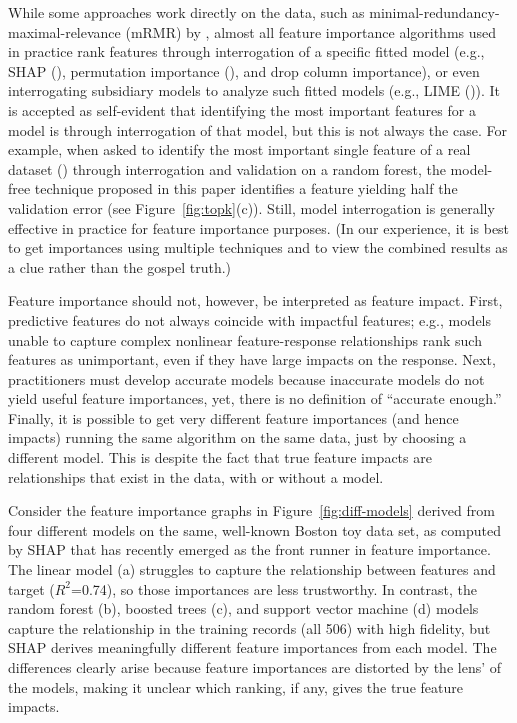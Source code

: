 \documentclass[twoside,11pt]{article}
\newcommand{\figref}[1]{Figure~\ref{#1}}
\begin{document}
While some approaches work directly on the data, such as minimal-redundancy-maximal-relevance (mRMR) by \cite{mRMR}, almost all feature importance algorithms used in practice rank features through interrogation of a specific fitted model (e.g., SHAP (\cite{shap}), permutation importance (\cite{RF}), and drop column importance), or even interrogating subsidiary models to analyze such fitted models (e.g., LIME (\cite{lime})). It is accepted as self-evident that identifying the most important features for a model is through interrogation of that  model, but this is not always the case.  For example, when asked to identify the most important single feature of a real dataset (\cite{bulldozer}) through interrogation and validation on a random forest, the model-free technique proposed in this paper identifies a feature yielding half the validation error (see \figref{fig:topk}(c)). Still, model interrogation is generally effective in practice for feature importance purposes. (In our experience, it is best to get importances using multiple techniques and to view the combined results as a clue rather than the gospel truth.)

Feature importance should not, however, be interpreted as feature impact. First, predictive features do not always coincide with impactful features; e.g., models unable to capture complex nonlinear feature-response relationships rank such features as unimportant, even if they have large impacts on the response. Next, practitioners must develop  accurate models because inaccurate models do not yield useful feature importances, yet, there is no definition of ``accurate enough.'' Finally, it is possible to get very different feature importances (and hence impacts) running the same algorithm on the same data, just by choosing a different model. This is despite the fact that true feature impacts are relationships that exist in the data, with or without a model.

Consider the feature importance graphs in \figref{fig:diff-models} derived from four different models on the same, well-known Boston toy data set, as computed by SHAP that has recently emerged as the front runner in feature importance. The linear model (a) struggles to capture the relationship between features and target ($R^2$=0.74), so those importances are less trustworthy.  In contrast, the random forest (b), boosted trees (c), and support vector machine (d) models capture the relationship in the training records (all 506) with high fidelity, but SHAP derives meaningfully different feature importances from each model. The differences clearly arise because feature importances are distorted by the lens' of the models, making it unclear which ranking, if any, gives the true feature impacts. 
\end{document}
